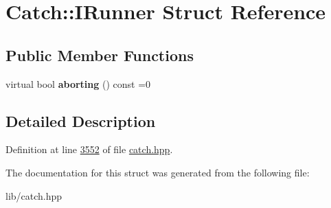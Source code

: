 \hypertarget{structCatch_1_1IRunner}{}\section{Catch\+::I\+Runner Struct Reference}
\label{structCatch_1_1IRunner}
\subsection*{Public Member Functions}
\begin{DoxyCompactItemize}
\item 
\mbox{\label{structCatch_1_1IRunner_a03713202dd2e041e30b8030088ab0116}} 
virtual bool {\bfseries aborting} () const =0
\end{DoxyCompactItemize}


\subsection{Detailed Description}


Definition at line \mbox{\hyperlink{catch_8hpp_source_l03552}{3552}} of file \mbox{\hyperlink{catch_8hpp_source}{catch.\+hpp}}.



The documentation for this struct was generated from the following file\+:\begin{DoxyCompactItemize}
\item 
lib/catch.\+hpp\end{DoxyCompactItemize}
